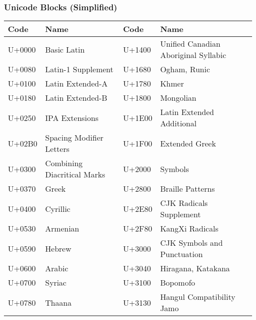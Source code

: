 \begin{frame}
\frametitle{Unicode Blocks (Simplified)}
\color{structure}
\begin{footnotesize}
\begin{table}
\begin{center}
\begin{tabular}{llll}
\hline
\textbf{Code}& \textbf{Name}& \textbf{Code}& \textbf{Name} \\
\hline
U+0000& Basic Latin& U+1400& Unified Canadian Aboriginal Syllabic \\
U+0080& Latin-1 Supplement& U+1680& Ogham, Runic \\
U+0100& Latin Extended-A& U+1780& Khmer \\
U+0180& Latin Extended-B& U+1800& Mongolian \\
U+0250& IPA Extensions& U+1E00& Latin Extended Additional \\
U+02B0& Spacing Modifier Letters& U+1F00& Extended Greek  \\
U+0300& Combining Diacritical Marks& U+2000& Symbols \\
U+0370& Greek& U+2800& Braille Patterns \\
U+0400& Cyrillic& U+2E80& CJK Radicals Supplement \\
U+0530& Armenian& U+2F80& KangXi Radicals \\
U+0590& Hebrew& U+3000& CJK Symbols and Punctuation \\
U+0600& Arabic& U+3040& Hiragana, Katakana \\
U+0700& Syriac& U+3100& Bopomofo \\
U+0780& Thaana& U+3130& Hangul Compatibility Jamo \\
\hline
\end{tabular}
\end{center}
\end{table}
\end{footnotesize}
\end{frame}

